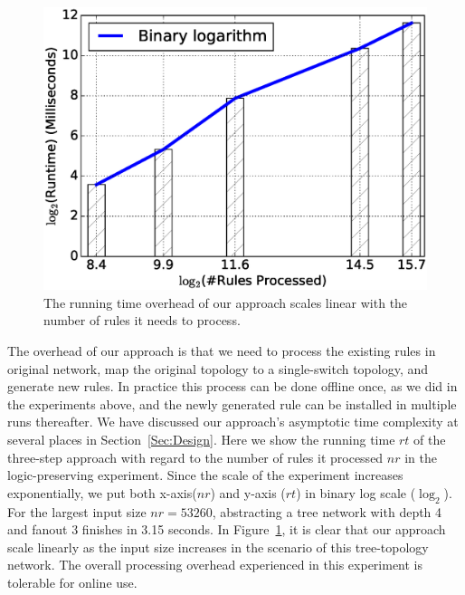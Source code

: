 \begin{figure}[h]
\centering
\includegraphics[scale=.42]{figures/bs_overhead.eps}
\caption{The running time overhead of our approach scales linear with the number of
        rules it needs to process.}
\label{Fig:BSOverhead}
\end{figure}

The overhead of our approach is that we need to process the existing rules in original network,
map the original topology to a single-switch topology, and
generate new rules.
In practice this process can be done offline once, as we did in the experiments above,
and the newly generated rule can be installed in multiple runs thereafter.
We have discussed our approach's asymptotic time complexity at several places in Section~\ref{Sec:Design}.
Here we show the running time $rt$ of the three-step approach with regard to
the number of rules it processed $nr$ in the logic-preserving experiment.
Since the scale of the experiment increases exponentially, we put both x-axis($nr$)
and y-axis ($rt$) in binary log scale ($\log_2$).
For the largest input size $nr=53260$, abstracting a tree network with depth 4 and
fanout 3 finishes in 3.15 seconds.
In Figure~\ref{Fig:BSOverhead}, it is clear that our approach scale linearly as the
input size increases in the scenario of this tree-topology network.
The overall processing overhead experienced in this experiment is tolerable for online use.

